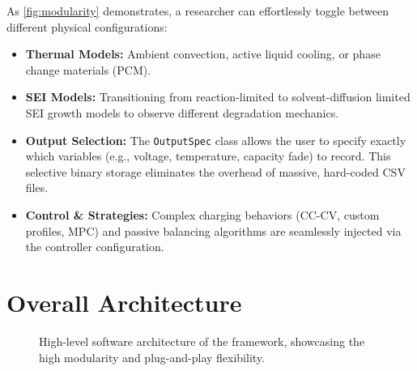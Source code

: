 As \cref{fig:modularity} demonstrates, a researcher can effortlessly toggle between different physical configurations:
\begin{itemize}
    \item \textbf{Thermal Models:} Ambient convection, active liquid cooling, or phase change materials (PCM).
    \item \textbf{SEI Models:} Transitioning from reaction-limited to solvent-diffusion limited SEI growth models to observe different degradation mechanics.
    \item \textbf{Output Selection:} The \texttt{OutputSpec} class allows the user to specify exactly which variables (e.g., voltage, temperature, capacity fade) to record. This selective binary storage eliminates the overhead of massive, hard-coded CSV files.
    \item \textbf{Control \& Strategies:} Complex charging behaviors (CC-CV, custom profiles, MPC) and passive balancing algorithms are seamlessly injected via the controller configuration.
\end{itemize}

\section{Overall Architecture}

\begin{figure}[H]
\centering
{}
\caption{High-level software architecture of the \VIBE{} framework, showcasing the high modularity and plug-and-play flexibility.}
\label{fig:arch_overview}
\end{figure}

